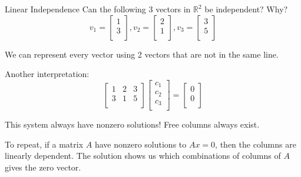 \documentclass{beamer}
\begin{document}
\begin{frame}{Linear Independence}
Can the following 3 vectors in $\mathbb{R}^2$ be independent? Why?
\begin{equation*}
    v_1=\left[ \begin{array}{c}
        1\\
        3\\
    \end{array} \right] , v_2=\left[ \begin{array}{c}
        2\\
        1\\
    \end{array} \right] , v_3=\left[ \begin{array}{c}
        3\\
        5\\
    \end{array} \right]
\end{equation*}

We can represent every vector using 2 vectors that are not in the same line.

\vspace{3pt}
Another interpretation:
\begin{equation*}
    \left[ \begin{matrix}
        1&		2&		3\\
        3&		1&		5\\
    \end{matrix} \right] \left[ \begin{array}{c}
        c_1\\
        c_2\\
        c_3\\
    \end{array} \right] =\left[ \begin{array}{c}
        0\\
        0\\
    \end{array} \right]
\end{equation*}

This system always have nonzero solutions! Free columns always exist.

\vspace{3pt}
To repeat, if a matrix $A$ have nonzero solutions to $Ax=0$, then the columns are linearly dependent. The solution shows us which combinations of columns of $A$ gives the zero vector.
\end{frame}
\end{document}
